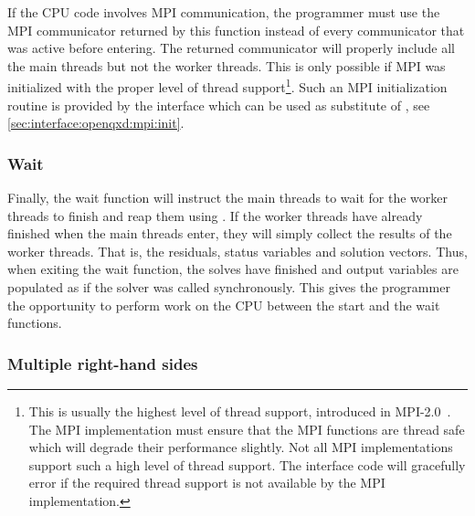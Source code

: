 If the CPU code involves MPI communication, the programmer must use the MPI communicator returned by this function instead of every communicator that was active before entering.
The returned communicator will properly include all the main threads but not the worker threads.
This is only possible if MPI was initialized with the proper level of thread support\footnote{This is usually the highest level of thread support,  introduced in MPI-2.0~\cite{standard:mpi-2.0}. The MPI implementation must ensure that the MPI functions are thread safe which will degrade their performance slightly. Not all MPI implementations support such a high level of thread support. The interface code will gracefully error if the required thread support is not available by the MPI implementation.}.
Such an MPI initialization routine is provided by the interface  which can be used as substitute of , see \cref{sec:interface:openqxd:mpi:init}.

\subsubsection{Wait}
\label{sec:interface:solver:async:wait}

Finally, the wait function  will instruct the main threads to wait for the worker threads to finish and reap them using .
If the worker threads have already finished when the main threads enter, they will simply collect the results of the worker threads.
That is, the residuals, status variables and solution vectors.
Thus, when exiting the wait function, the solves have finished and output variables are populated as if the solver was called synchronously.
This gives the programmer the opportunity to perform work on the CPU between the start and the wait functions.

\subsubsection{Multiple right-hand sides}

